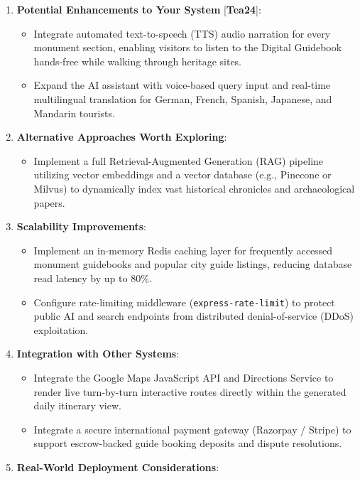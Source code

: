 \documentclass[12pt,a4paper,twoside,openright]{report}
\begin{document}
\begin{enumerate}[leftmargin=*]
    \item \textbf{Potential Enhancements to Your System} [\textbf{Tea24}]:
    \begin{itemize}
        \item Integrate automated text-to-speech (TTS) audio narration for every monument section, enabling visitors to listen to the Digital Guidebook hands-free while walking through heritage sites.
        \item Expand the AI assistant with voice-based query input and real-time multilingual translation for German, French, Spanish, Japanese, and Mandarin tourists.
    \end{itemize}
    \item \textbf{Alternative Approaches Worth Exploring}:
    \begin{itemize}
        \item Implement a full Retrieval-Augmented Generation (RAG) pipeline utilizing vector embeddings and a vector database (e.g., Pinecone or Milvus) to dynamically index vast historical chronicles and archaeological papers.
    \end{itemize}
    \item \textbf{Scalability Improvements}:
    \begin{itemize}
        \item Implement an in-memory Redis caching layer for frequently accessed monument guidebooks and popular city guide listings, reducing database read latency by up to 80\%.
        \item Configure rate-limiting middleware (\texttt{express-rate-limit}) to protect public AI and search endpoints from distributed denial-of-service (DDoS) exploitation.
    \end{itemize}
    \item \textbf{Integration with Other Systems}:
    \begin{itemize}
        \item Integrate the Google Maps JavaScript API and Directions Service to render live turn-by-turn interactive routes directly within the generated daily itinerary view.
        \item Integrate a secure international payment gateway (Razorpay / Stripe) to support escrow-backed guide booking deposits and dispute resolutions.
    \end{itemize}
    \item \textbf{Real-World Deployment Considerations}:
    \begin{itemize}

\end{itemize}
\end{enumerate}
\end{document}
